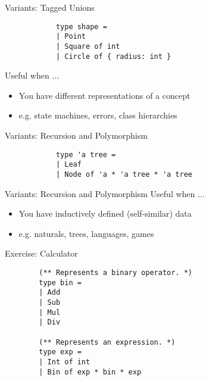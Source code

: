 \documentclass{beamer}
\begin{document}
    \begin{frame}[fragile=singleslide]{Variants: Tagged Unions}
        \begin{verbatim}
            type shape =
            | Point
            | Square of int
            | Circle of { radius: int }
        \end{verbatim}
    \end{frame}

    \begin{frame}
        Useful when $\ldots$
        \begin{itemize}
            \item<1-> You have different representations of a concept
            \item<2-> e.g. state machines, errors, class hierarchies
        \end{itemize}

    \end{frame}

    \begin{frame}[fragile=singleslide]{Variants: Recursion and Polymorphism}
        \begin{verbatim}
            type 'a tree =
            | Leaf
            | Node of 'a * 'a tree * 'a tree
        \end{verbatim}
    \end{frame}

    \begin{frame}{Variants: Recursion and Polymorphism}
        Useful when $\ldots$
        \begin{itemize}
            \item<1-> You have inductively defined (self-similar) data
            \item<2-> e.g. naturals, trees, languages, games
        \end{itemize}
    \end{frame}
    
    \begin{frame}[fragile=singleslide]{Exercise: Calculator}
        \begin{verbatim} 
        (** Represents a binary operator. *)
        type bin =
        | Add
        | Sub
        | Mul
        | Div

        (** Represents an expression. *)
        type exp =
        | Int of int
        | Bin of exp * bin * exp
        \end{verbatim}
    \end{frame}
\end{document}
